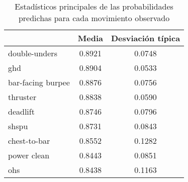 \begin{table}[H]
\centering
\caption{Estadísticos principales de las probabilidades predichas para cada movimiento observado}
\label{table_probabilities}
\begin{tabular}{lcc}
\toprule
{} &   Media &  Desviación típica \\
\midrule
double-unders     &  0.8921 &             0.0748 \\
ghd               &  0.8904 &             0.0533 \\
bar-facing burpee &  0.8876 &             0.0756 \\
thruster          &  0.8838 &             0.0590 \\
deadlift          &  0.8746 &             0.0796 \\
shspu             &  0.8731 &             0.0843 \\
chest-to-bar      &  0.8552 &             0.1282 \\
power clean       &  0.8443 &             0.0851 \\
ohs               &  0.8438 &             0.1163 \\
\bottomrule
\end{tabular}
\end{table}
